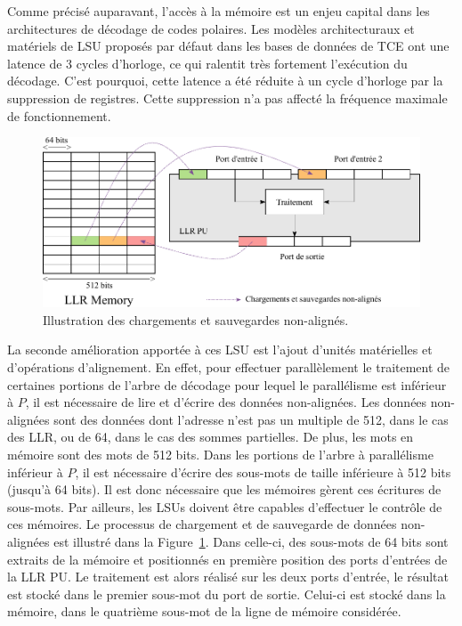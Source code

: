 Comme précisé auparavant, l'accès à la mémoire est un enjeu capital dans les architectures de décodage de codes polaires. Les modèles architecturaux et matériels de LSU proposés par défaut dans les bases de données de TCE ont une latence de 3 cycles d'horloge, ce qui ralentit très fortement l’exécution du décodage. C'est pourquoi, cette latence a été réduite à un cycle d'horloge par la suppression de registres. Cette suppression n'a pas affecté la fréquence maximale de fonctionnement.
\begin{figure}[htp]
	\centering
	\includegraphics[width=\textwidth]{main/ch4_fig/unaligned}
	\caption{Illustration des chargements et sauvegardes non-alignés.}
	\label{fig:unaligned}
\end{figure}

La seconde amélioration apportée à ces LSU est l'ajout d'unités matérielles et d'opérations d'alignement. En effet, pour effectuer parallèlement le traitement de certaines portions de l'arbre de décodage pour lequel le parallélisme est inférieur à $P$, il est nécessaire de lire et d'écrire des données non-alignées. Les données non-alignées sont des données dont l'adresse n'est pas un multiple de 512, dans le cas des LLR, ou de 64, dans le cas des sommes partielles. De plus, les mots en mémoire sont des mots de 512 bits. Dans les portions de l'arbre à parallélisme inférieur à $P$, il est nécessaire d'écrire des sous-mots de taille inférieure à 512 bits (jusqu'à 64 bits). Il est donc nécessaire que les mémoires gèrent ces écritures de sous-mots. Par ailleurs, les LSUs doivent être capables d'effectuer le contrôle de ces mémoires. Le processus de chargement et de sauvegarde de données non-alignées est illustré dans la Figure~\ref{fig:unaligned}. Dans celle-ci, des sous-mots de 64 bits sont extraits de la mémoire et positionnés en première position des ports d'entrées de la LLR PU. Le traitement est alors réalisé sur les deux ports d'entrée, le résultat est stocké dans le premier sous-mot du port de sortie. Celui-ci est stocké dans la mémoire, dans le quatrième sous-mot de la ligne de mémoire considérée.

